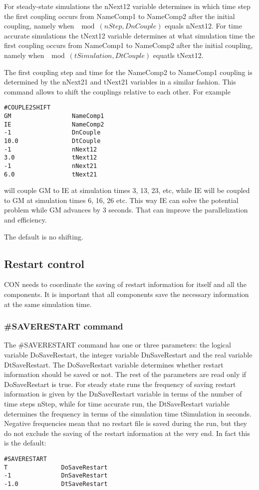 For steady-state simulations the nNext12 variable determines in which time 
step the first coupling occurs from NameComp1 to NameComp2
after the initial coupling, namely 
when $\mod(nStep,DnCouple)$ equals nNext12. For time accurate
simulations the tNext12 variable determines at what simulation
time the first coupling occurs from NameComp1 to NameComp2
after the initial coupling, namely
when $\mod(tSimulation,DtCouple)$ equatls tNext12.

The first coupling step and time for the NameComp2 to NameComp1
coupling is determined by the nNext21 and tNext21 variables
in a similar fashion. This command allows to shift the couplings 
relative to each other. For example
\begin{verbatim}
#COUPLE2SHIFT
GM                 NameComp1
IE                 NameComp2
-1                 DnCouple
10.0               DtCouple
-1                 nNext12
3.0                tNext12
-1                 nNext21
6.0                tNext21
\end{verbatim}
will couple GM to IE at simulation times 3, 13, 23, etc, while
IE will be coupled to GM at simulation times 6, 16, 26 etc.
This way IE can solve the potential problem while GM advances by 3 seconds.
That can improve the parallelization and efficiency.

The default is no shifting.

\subsection{Restart control}

CON needs to coordinate the saving of restart information for itself
and all the components. It is important that all components save
the necessary information at the same simulation time.

\subsubsection{\#SAVERESTART command}

The \#SAVERESTART command has one or three parameters: the logical variable
DoSaveRestart, the integer variable DnSaveRestart and the 
real variable DtSaveRestart. The DoSaveRestart variable determines
whether restart information should be saved or not. The rest of
the parameters are read only if DoSaveRestart is true. 
For steady state runs the frequency of saving restart information is given by
the DnSaveRestart variable in terms of the number of time steps nStep,
while for time accurate run, the DtSaveRestart variable determines
the frequency in terms of the simulation time tSimulation in seconds.
Negative frequencies mean that no restart file is saved during the run,
but they do not exclude the saving of the restart information at
the very end. In fact this is the default:
\begin{verbatim}
#SAVERESTART
T               DoSaveRestart
-1              DnSaveRestart
-1.0            DtSaveRestart
\end{verbatim}


